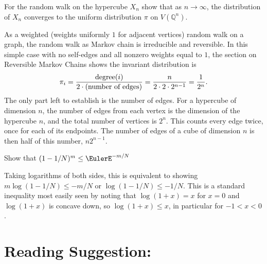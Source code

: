 \documentclass[12pt]{article}
\begin{document}
\begin{exercise}
    For the random walk on the hypercube \( X_n \) show that as \( n \to
    \infty \), the distribution of \( X_n \) converges to the uniform
    distribution \( \pi \) on \( V(\mathbb{Q}^n) \).
\end{exercise}
\begin{solution}
    As a weighted (weights uniformly \( 1 \) for adjacent vertices)
    random walk on a graph, the random walk as Markov chain is
    irreducible and reversible.  In this simple case with no self-edges
    and all nonzero weights equal to \( 1 \), the section on Reversible
    Markov Chains shows the invariant distribution is
    \[
        \pi_i = \frac{%
        \operatorname{degree}
        (i)}{2 \cdot (\text{number of edges})} = \frac{n}{2 \cdot 2
        \cdot 2^{n-1}} = \frac{1}{2^n}.
    \] The only part left to establish is the number of edges.  For a
    hypercube of dimension \( n \), the number of edges from each vertex
    is the dimension of the hypercube \( n \), and the total number of
    vertices is \( 2^n \).  This counts every edge twice, once for each
    of its endpoints.  The number of edges of a cube of dimension \( n \)
    is then half of this number, \( n 2^{n-1} \).
\end{solution}

\begin{exercise}
    Show that \( (1 - 1/N)^m \le \EulerE^{-m/N} \)
\end{exercise}
\begin{solution}
    Taking logarithms of both sides, this is equivalent to showing \( m
    \log(1 - 1/N) \le -m/N \) or \( \log(1 - 1/N) \le -1/N \).  This is
    a standard inequality most easily seen by noting that \( \log(1 +x )
    = x \) for \( x = 0 \) and \( \log( 1 + x) \) is concave down, so \(
    \log(1 + x) \le x \), in particular for \( -1 < x < 0 \).
\end{solution}
\hr

\section*{Reading Suggestion:}



\end{document}
